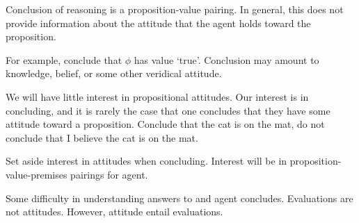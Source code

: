 \begin{note}
  Conclusion of reasoning is a proposition-value pairing.
  In general, this does not provide information about the attitude that the agent holds toward the proposition.

  For example, conclude that \(\phi\) has value `true'.
  Conclusion may amount to knowledge, belief, or some other veridical attitude.

  We will have little interest in propositional attitudes.
  Our interest is in concluding, and it is rarely the case that one concludes that they have some attitude toward a proposition.
  Conclude that the cat is on the mat, do not conclude that I believe the cat is on the mat.

  Set aside interest in attitudes when concluding.
  Interest will be in proposition-value-premises pairings for agent.
\end{note}

\begin{note}
  Some difficulty in understanding answers to \qWhy{} and agent concludes.
  Evaluations are not attitudes.
  However, attitude entail evaluations.
\end{note}


